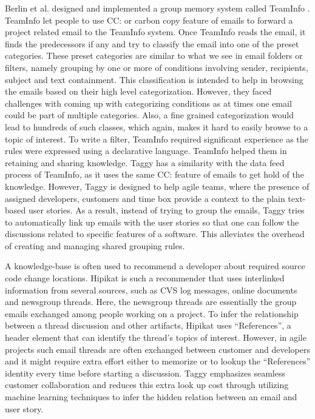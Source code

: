 Berlin et al. designed and implemented a group memory system called TeamInfo \cite{where_did_you}. TeamInfo let people to use CC: or carbon copy feature of emails to forward a project related email to the TeamInfo system. Once TeamInfo reads the email, it finds the predecessors if any and try to classify the email into one of the preset categories. These preset categories are similar to what we see in email folders or filters, namely grouping by one or more of conditions involving sender, recipients, subject and text containment. This classification is intended to help in browsing the emails based on their high level categorization. However, they faced challenges with coming up with categorizing conditions as at times one email could be part of multiple categories. Also, a fine grained categorization would lead to hundreds of such classes, which again, makes it hard to easily browse to a topic of interest. To write a filter, TeamInfo required significant experience as the rules were expressed using a declarative language. TeamInfo helped them in retaining and sharing knowledge. Taggy has a similarity with the data feed process of TeamInfo, as it uses the same CC: feature of emails to get hold of the knowledge. However, Taggy is designed to help agile teams, where the presence of assigned developers, customers and time box provide a context to the plain text-based user stories. As a result, instead of trying to group the emails, Taggy tries to automatically link up emails with the user stories so that one can follow the discussions related to specific features of a software. This alleviates the overhead of creating and managing shared grouping rules.

A knowledge-base is often used to recommend a developer about required source code change locations. Hipikat is such a recommender that uses interlinked information from several sources, such as CVS log messages, online documents and newsgroup threads\cite{hipikat}. Here, the newsgroup threads are essentially the group emails exchanged among people working on a project. To infer the relationship between a thread discussion and other artifacts, Hipikat uses ``References'', a header element that can identify the thread's topics of interest. However, in agile projects such email threads are often exchanged between customer and developers and it might require extra effort either to memorize or to lookup the ``References'' identity every time before starting a discussion. Taggy emphasizes seamless customer collaboration and reduces this extra look up cost through utilizing machine learning techniques to infer the hidden relation between an email and user story.

